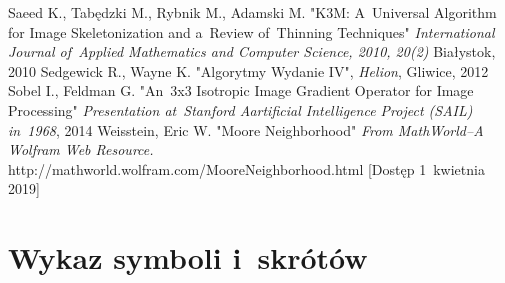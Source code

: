 \documentclass[a4paper,11pt,twoside,openright]{report}
\newcommand\blankpage{%
    \null
    \thispagestyle{empty}%
    \newpage}
\theoremstyle{definition}
\begin{document}
\begin{thebibliography}{24}
 Saeed K., Tabędzki M., Rybnik M., Adamski M. "K3M: A~Universal Algorithm for Image Skeletonization and a~Review of~Thinning Techniques" \emph{International Journal of~Applied Mathematics and Computer Science, 2010, 20(2)} Białystok, 2010
 Sedgewick R., Wayne K. "Algorytmy Wydanie IV", \emph{Helion}, Gliwice, 2012
 Sobel I., Feldman G. "An~3x3 Isotropic Image Gradient Operator for Image Processing" \emph {Presentation at~Stanford Aartificial Intelligence Project (SAIL) in~1968}, 2014
 Weisstein, Eric W. "Moore Neighborhood" \emph{From MathWorld--A Wolfram Web Resource.} http://mathworld.wolfram.com/MooreNeighborhood.html [Dostęp 1~kwietnia 2019]

\end{thebibliography}




\afterpage{\blankpage}
\chapter*{Wykaz symboli i~skrótów}
\end{document}
